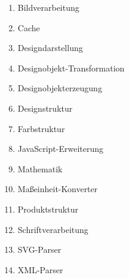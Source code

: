 \begin{enumerate}
\item{Bildverarbeitung} 
\item{Cache} 
\item{Designdarstellung} 
\item{Designobjekt-Transformation} 
\item{Designobjekterzeugung} 
\item{Designstruktur} 
\item{Farbstruktur} 
\item{JavaScript-Erweiterung} 
\item{Mathematik}  
\item{Maßeinheit-Konverter} 
\item{Produktstruktur} 
\item{Schriftverarbeitung} 
\item{SVG-Parser} 
\item{XML-Parser} 
\end{enumerate} 